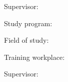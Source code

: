 


Supervisor: \mySupervisor

\medskip{}
\myDate


\newpage
\thispagestyle{empty}
\mbox{}
\newpage





Study program: \myStudyProgram

Field of study: \myStudyField

Training workplace: \myInstitude

Supervisor: \mySupervisor

\medskip{}

\myDate


\newpage
\thispagestyle{empty}
\mbox{}
\newpage


